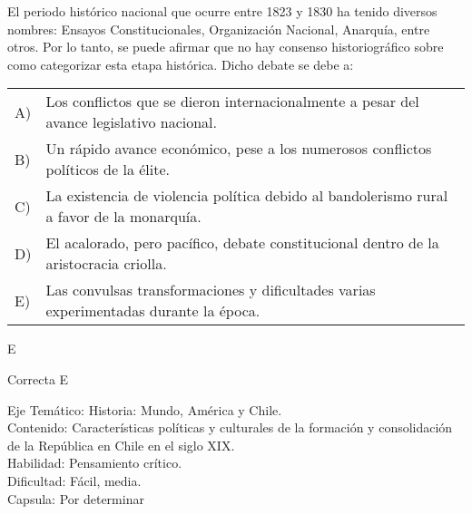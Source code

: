 \documentclass[letterpaper,11pt]{article}
\newcommand{\anchopregunta}{0.9\textwidth}
\begin{document}
\begin{enumerate}
\begin{minipage}{\anchopregunta}
\item El periodo histórico nacional que ocurre entre 1823 y 1830 ha tenido diversos nombres: Ensayos Constitucionales, Organización Nacional, Anarquía, entre otros. Por lo tanto, se puede afirmar que no hay consenso historiográfico sobre como categorizar esta etapa histórica. Dicho debate se debe a:\\
\begin{flushleft}\begin{tabular}{@{\hspace{-.001\textwidth}}l@{\hspace{2pt}}p{}}
A)& Los conflictos que se dieron internacionalmente a pesar del avance legislativo nacional.\\
B)& Un rápido avance económico, pese a los numerosos conflictos políticos de la élite.\\
C)& La existencia de violencia política debido al bandolerismo rural a favor de la monarquía.\\
D)& El acalorado, pero pacífico, debate constitucional dentro de la aristocracia criolla.\\
E)& Las convulsas transformaciones y dificultades varias experimentadas durante la época.\\ 
\end{tabular}\end{flushleft}%
\begin{key} E
\end{key} 
\begin{hint}
\end{hint}
\begin{answer} Correcta E \\
\end{answer}
\begin{info} %
\begin{flushleft}
Eje Temático: Historia: Mundo, América y Chile.\\
Contenido: Características políticas y culturales de la formación y consolidación de la República en Chile en el siglo XIX.\\
Habilidad: Pensamiento crítico.\\
Dificultad: Fácil, media. \\
Capsula: Por determinar \\
\end{flushleft} 
\end{info}
\end{minipage}\vfill$\;$ %


\end{enumerate}
\end{document}
